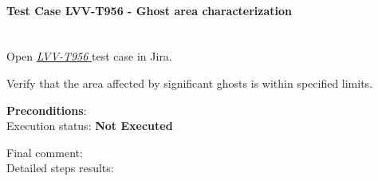 \documentclass[DM,lsstdraft,STR,toc]{lsstdoc}
\begin{document}
\paragraph{Test Case LVV-T956 - Ghost area characterization
 }\mbox{}\\

Open  \href{https://jira.lsstcorp.org/secure/Tests.jspa#/testCase/LVV-T956}{\textit{ LVV-T956 } }
test case in Jira.

Verify that the area affected by significant ghosts is within specified
limits.


\textbf{ Preconditions}:\\


Execution status: {\bf Not Executed }

Final comment:\\


Detailed steps results:
\end{document}

